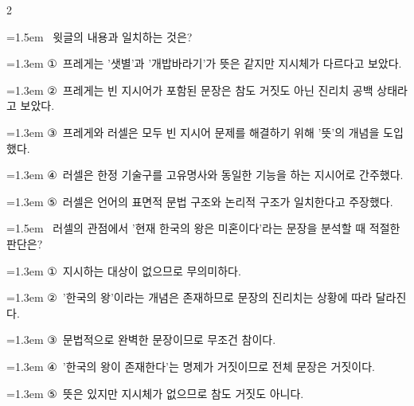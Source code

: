 \documentclass[10pt, a4paper]{article}
\begin{document}
\begin{multicols}{2}
\noindent\begin{minipage}{\columnwidth}
\vspace{2mm}
{\hangindent=1.5em  ~윗글의 내용과 일치하는 것은?\par}

\vspace{0.5mm}
{\hangindent=1.3em  \noindent\hspace{0.3em}①~프레게는 '샛별'과 '개밥바라기'가 뜻은 같지만 지시체가 다르다고 보았다.\par}
{\hangindent=1.3em  \noindent\hspace{0.3em}②~프레게는 빈 지시어가 포함된 문장은 참도 거짓도 아닌 진리치 공백 상태라고 보았다.\par}
{\hangindent=1.3em  \noindent\hspace{0.3em}③~프레게와 러셀은 모두 빈 지시어 문제를 해결하기 위해 '뜻'의 개념을 도입했다.\par}
{\hangindent=1.3em  \noindent\hspace{0.3em}④~러셀은 한정 기술구를 고유명사와 동일한 기능을 하는 지시어로 간주했다.\par}
{\hangindent=1.3em  \noindent\hspace{0.3em}⑤~러셀은 언어의 표면적 문법 구조와 논리적 구조가 일치한다고 주장했다.\par}
\vspace{4mm}
\end{minipage}
\par

\noindent\begin{minipage}{\columnwidth}
\vspace{2mm}
{\hangindent=1.5em  ~러셀의 관점에서 '현재 한국의 왕은 미혼이다'라는 문장을 분석할 때 적절한 판단은?\par}

\vspace{0.5mm}
{\hangindent=1.3em  \noindent\hspace{0.3em}①~지시하는 대상이 없으므로 무의미하다.\par}
{\hangindent=1.3em  \noindent\hspace{0.3em}②~'한국의 왕'이라는 개념은 존재하므로 문장의 진리치는 상황에 따라 달라진다.\par}
{\hangindent=1.3em  \noindent\hspace{0.3em}③~문법적으로 완벽한 문장이므로 무조건 참이다.\par}
{\hangindent=1.3em  \noindent\hspace{0.3em}④~'한국의 왕이 존재한다'는 명제가 거짓이므로 전체 문장은 거짓이다.\par}
{\hangindent=1.3em  \noindent\hspace{0.3em}⑤~뜻은 있지만 지시체가 없으므로 참도 거짓도 아니다.\par}
\vspace{4mm}
\end{minipage}
\par


\end{multicols}
\end{document}
